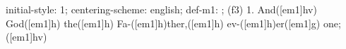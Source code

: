 initial-style: 1;
centering-scheme: english;
def-m1: \grealign;
(f3) 1. And([em1]hv) God([em1]h) the([em1]h) Fa-([em1]h)ther,([em1]h) ev-([em1]h)er([em1]g) one;([em1]hv)